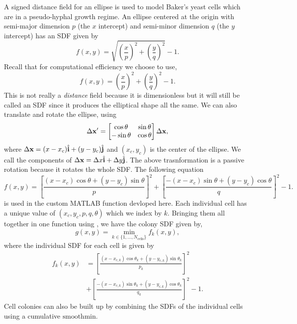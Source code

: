 A signed distance field for an ellipse is used to model Baker's yeast cells which
are in a pseudo-hyphal growth regime.
An ellipse centered at the origin with semi-major dimension $p$ (the $x$ intercept) and
semi-minor dimension $q$ (the $y$ intercept) has an SDF given by
\begin{equation*}
    f(x,y) = \sqrt{ \left( \frac{x}{p} \right)^2 + \left( \frac{y}{q} \right)^2 } - 1.
\end{equation*}
Recall that for computational efficiency we choose to use,
\begin{equation*}
    f(x,y) = \left( \frac{x}{p} \right)^2 + \left( \frac{y}{q} \right)^2  - 1.
\end{equation*}
This is not really a \textit{distance} field because it is 
dimensionless but it will still be called an SDF since it produces the 
elliptical shape all the same. We can also translate and rotate the ellipse, using
\begin{equation*} 
    \Delta \vb{x}' = 
    \begin{bmatrix}
        \cos{\theta} & \sin{\theta} \\
        -\sin{\theta} & \cos{\theta} 
    \end{bmatrix}
    \Delta \vb{x},
\end{equation*}
where $\Delta \vb{x} = (x-x_c) \hat{\vb{i}} + (y-y_c)\hat{\vb{j}} $ and $(x_c,y_c)$ is the
center of the ellipse. We call the components of $\Delta \vb{x} = \Delta x \hat{\vb{i}} +
\Delta y \hat{\vb{j}} $. The above trasnformation is a passive rotation because 
it rotates the whole SDF. The following equation
\begin{equation*}
    f(x,y) = \left[\frac{ (x-x_c)\cos{\theta} + (y-y_c) \sin{\theta}}{p} \right]^2 
        + \left[ \frac{-(x-x_c)\sin{\theta} +(y-y_c) \cos{\theta}}{q} \right]^2 - 1.
\end{equation*}
is used in the custom MATLAB function  devloped here. Each individual 
cell has a unique value of $(x_c,y_c,p,q,\theta)$ which we index by $k$. Bringing them all 
together in one function using , we have the colony SDF given by,
\begin{equation*}
    g(x,y) = \min_{k \in \{1, ..., N_{\textrm{cells}}\}} f_k(x,y),
\end{equation*}
where the individual SDF for each cell is given by 
\begin{equation*}
    \begin{split}
    f_k(x,y) &= \left[\frac{ (x-x_{c,k})\cos{\theta_k} + (y-y_{c,k}) \sin{\theta_k}}{p_k} \right]^2 \\ 
        &+ \left[ \frac{-(x-x_{c,k})\sin{\theta_k} +(y-y_{c,k}) \cos{\theta_k}}{q_k} \right]^2 - 1.
    \end{split}
\end{equation*}
Cell colonies can also be built up by combining the SDFs of the individual cells 
using a cumulative $\textrm{smoothmin}$.
\\

